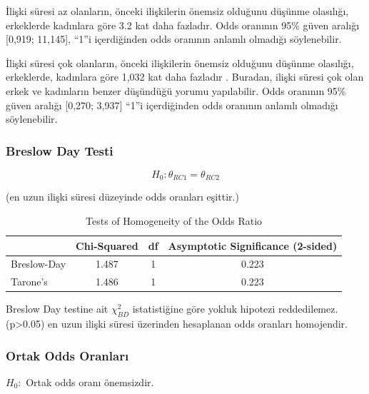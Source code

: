 \documentclass{article}
\begin{document}
\vspace{10pt}
İlişki süresi az olanların, önceki ilişkilerin önemsiz olduğunu düşünme olasılığı, erkeklerde kadınlara göre 3.2 kat daha fazladır. Odds oranının 95\% güven aralığı [0,919;  11,145], “1”i içerdiğinden odds oranının anlamlı olmadığı söylenebilir.

\vspace{10pt}
İlişki süresi çok olanların, önceki ilişkilerin önemsiz olduğunu düşünme olasılığı, erkeklerde, kadınlara göre 1,032 kat daha fazladır . Buradan, ilişki süresi çok olan erkek ve kadınların benzer düşündüğü yorumu yapılabilir. Odds oranının 95\% güven aralığı [0,270;  3,937] “1”i içerdiğinden odds oranının anlamlı olmadığı söylenebilir.

\subsubsection{Breslow Day Testi}

\vspace{50pt}

$$H_0: \theta_{RC1} = \theta_{RC2} $$  

\begin{center}
(en uzun ilişki süresi düzeyinde odds oranları eşittir.)
\end{center}
\vspace{20pt}
\begin{table}[htbp]
\centering
\caption{Tests of Homogeneity of the Odds Ratio}
\label{tab:homogeneity-tests}
\begin{tabular}{lccc}
\hline
 & \textbf{Chi-Squared} & \textbf{df} & \textbf{Asymptotic Significance (2-sided)} \\
\hline
Breslow-Day & 1.487 & 1 & 0.223 \\
Tarone's & 1.486 & 1 & 0.223 \\
\hline
\end{tabular}
\end{table}

\vspace{10pt}
Breslow Day testine ait $\chi^2_{BD}$ istatistiğine göre yokluk hipotezi reddedilemez. (p>0.05) en uzun ilişki süresi üzerinden hesaplanan odds oranları homojendir. 

\subsubsection{Ortak Odds Oranları}

\begin{center}
    $H_0:$ Ortak odds oranı önemsizdir.  
\end{center}
\end{document}
